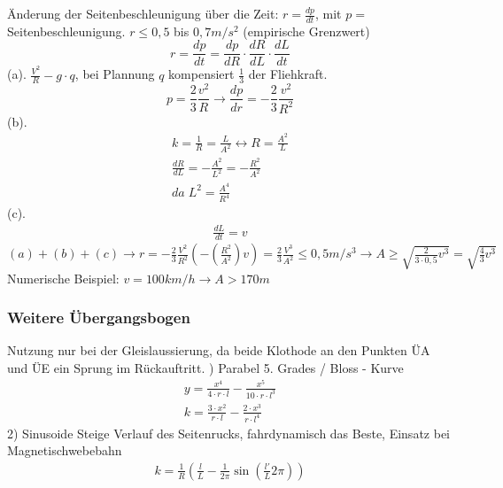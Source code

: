 \documentclass[12pt]{article}
\begin{document}
Änderung der Seitenbeschleunigung über die Zeit: $r = \frac{dp}{dt}$, mit $p=$ Seitenbeschleunigung. $r \leq 0,5$ bis $0,7m/s^2$ (empirische Grenzwert) 
\begin{equation*}
r = \frac{dp}{dt} = \frac{dp}{dR} \cdot \frac{dR}{dL} \cdot \frac{dL}{dt}
\end{equation*}
(a). $\frac{V^2}{R} - g \cdot q$, bei Plannung $q$ kompensiert $\frac{1}{3}$ der Fliehkraft.
\begin{equation*}
p = \frac{2}{3} \frac{v^2}{R} \longrightarrow \frac{dp}{dr} = - \frac{2}{3} \frac{v^2}{R^2}
\end{equation*}
(b). 
\begin{gather*}
k = \frac{1}{R} = \frac{L}{A^2} \longleftrightarrow R = \frac{A^2}{L} \\
\frac{dR}{dL} = - \frac{A^2}{L^2} = - \frac{R^2}{A^2} \\
da \; L^2 = \frac{A^4}{R^4}
\end{gather*}
(c). 
\begin{gather*}
\frac{dL}{dt} = v
\end{gather*}
$(a) + (b) + (c) \longrightarrow r = - \frac{2}{3} \frac{V^2}{R^2}(-(\frac{R^2}{A^2}) v) = \frac{2}{3} \frac{V^3}{A^2} \leq 0,5 m/s^3 \longrightarrow A \geq \sqrt{\frac{2}{3 \cdot 0,5} v^3} = \sqrt{\frac{4}{3} v^3}$ \newline
Numerische Beispiel: $v = 100km/h \longrightarrow A > 170m$
\subsubsection{Weitere Übergangsbogen}
Nutzung nur bei der Gleislaussierung, da beide Klothode an den Punkten ÜA und ÜE ein Sprung im Rückauftritt. ) Parabel 5. Grades / Bloss - Kurve
\begin{gather*}
y = \frac{x^4}{4 \cdot r \cdot l} - \frac{x^5}{10 \cdot r \cdot l^3} \\
k = \frac{3 \cdot x^2}{r \cdot l} - \frac{2 \cdot x^3}{r \cdot l^4}
\end{gather*}
2) Sinusoide \newline
Steige Verlauf des Seitenrucks, fahrdynamisch das Beste, Einsatz bei Magnetischwebebahn
\begin{gather*}
k = \frac{1}{R} (\frac{l}{L} - \frac{1}{2\pi} \sin (\frac{l'}{L} 2\pi))
\end{gather*}
\end{document}
